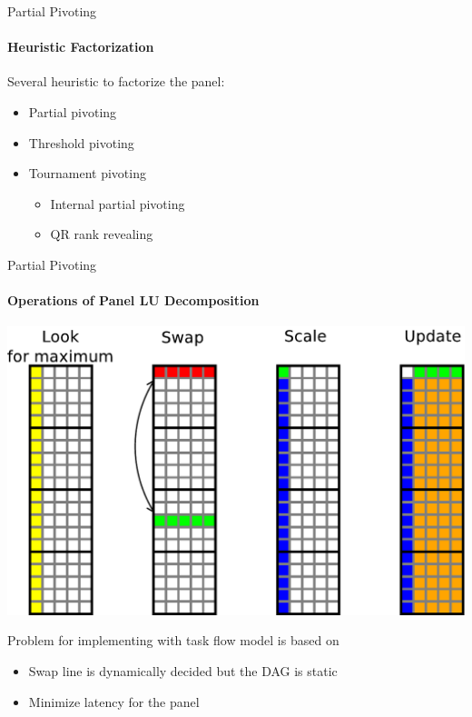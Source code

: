 \begin{frame}{Partial Pivoting}
\framesubtitle{Heuristic Factorization}
Several heuristic to factorize the panel:
\begin{itemize}
\item Partial pivoting
\item Threshold pivoting
\item Tournament pivoting
\begin{itemize}
\item Internal partial pivoting
\item QR rank revealing
\end{itemize}
\end{itemize}
\end{frame}


\begin{frame}{Partial Pivoting}
\framesubtitle{Operations of Panel LU Decomposition}
\begin{center}
\includegraphics[scale=0.3]{panel_operation.pdf}
\end{center}
\pause
\begin{exampleblock}{Problem for implementing with task flow model is based on}
\begin{itemize}
\item Swap line is dynamically decided but the DAG is static
\item Minimize latency for the panel
\end{itemize}
\end{exampleblock}{}
\end{frame}




